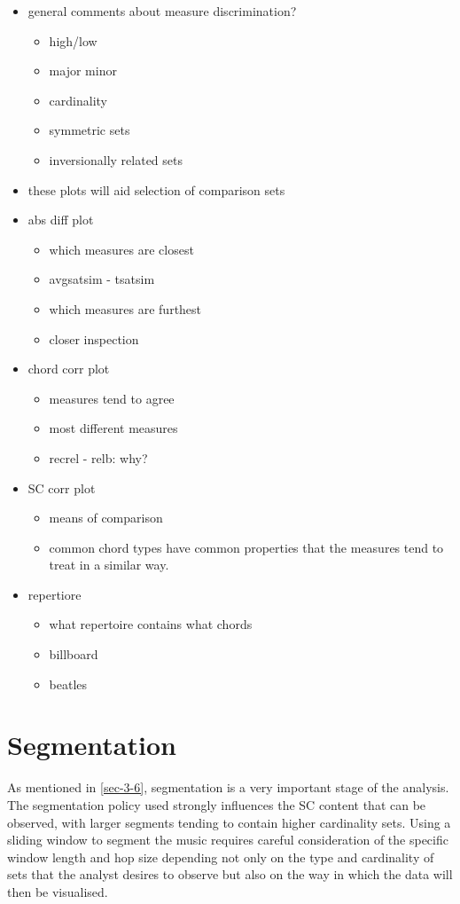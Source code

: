 \documentclass{article}
\begin{document}
\begin{itemize}
\item general comments about measure discrimination?
\begin{itemize}
\item high/low
\item major minor
\item cardinality
\item symmetric sets
\item inversionally related sets
\end{itemize}
\item these plots will aid selection of comparison sets
\item abs diff plot
\begin{itemize}
\item which measures are closest
\item avgsatsim - tsatsim
\item which measures are furthest
\item closer inspection
\end{itemize}
\item chord corr plot
\begin{itemize}
\item measures tend to agree
\item most different measures
\item recrel - relb: why?
\end{itemize}
\item SC corr plot
\begin{itemize}
\item means of comparison
\item common chord types have common properties that the measures tend
    to treat in a similar way.
\end{itemize}
\item repertiore
\begin{itemize}
\item what repertoire contains what chords
\item billboard
\item beatles
\end{itemize}
\end{itemize}
\section{Segmentation}
\label{sec-8}

As mentioned in \ref{sec-3-6}, segmentation is a very
important stage of the analysis. The segmentation policy used strongly
influences the SC content that can be observed, with larger segments
tending to contain higher cardinality sets. Using a sliding window to
segment the music requires careful consideration of the specific
window length and hop size depending not only on the type and
cardinality of sets that the analyst desires to observe but also on
the way in which the data will then be visualised.
\end{document}
